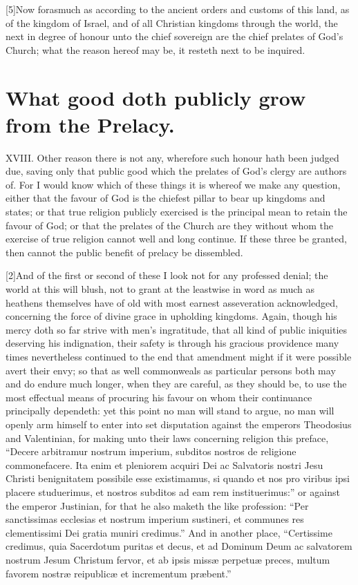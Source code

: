 [5]Now forasmuch as according to the ancient orders and customs of this land, as of the kingdom of Israel, and of all Christian kingdoms through the world, the next in degree of honour unto the chief sovereign are the chief prelates of God’s Church; what the reason hereof may be, it resteth next to be inquired.

\section*{What good doth publicly grow from the Prelacy.}

XVIII. Other reason there is not any, wherefore such honour hath been judged due, saving only that public good which the prelates of God’s clergy are authors of. For I would know which of these things it is whereof we make any question, either that the favour of God is the chiefest pillar to bear up kingdoms and states; or that true religion publicly exercised is the principal mean to retain the favour of God; or that the prelates of the Church are they without whom the exercise of true religion cannot well and long continue. If these three be granted, then cannot the public benefit of prelacy be dissembled.

[2]And of the first or second of these I look not for any professed denial; the world at this will blush, not to grant at the leastwise in word as much as heathens themselves have of old with most earnest asseveration acknowledged, concerning the force of divine grace in upholding kingdoms. Again, though his mercy doth so far strive with men’s ingratitude, that all kind of public iniquities deserving his indignation, their safety is through his gracious providence many times nevertheless continued to the end that amendment might  if it were possible avert their envy; so that as well commonweals as particular persons both may and do endure much longer, when they are careful, as they should be, to use the most effectual means of procuring his favour on whom their continuance principally dependeth: yet this point no man will stand to argue, no man will openly arm himself to enter into set disputation against the emperors Theodosius and Valentinian, for making unto their laws concerning religion this preface, “Decere arbitramur nostrum imperium, subditos nostros de religione commonefacere. Ita enim et pleniorem acquiri Dei ac Salvatoris nostri Jesu Christi benignitatem possibile esse existimamus, si quando et nos pro viribus ipsi placere studuerimus, et nostros subditos ad eam rem instituerimus:” or against the emperor Justinian, for that he also maketh the like profession: “Per sanctissimas ecclesias et nostrum imperium sustineri, et communes res clementissimi Dei gratia muniri credimus.” And in another place, “Certissime credimus, quia Sacerdotum puritas et decus, et ad Dominum Deum ac salvatorem nostrum Jesum Christum fervor, et ab ipsis missæ perpetuæ preces, multum favorem nostræ reipublicæ et incrementum præbent.”

